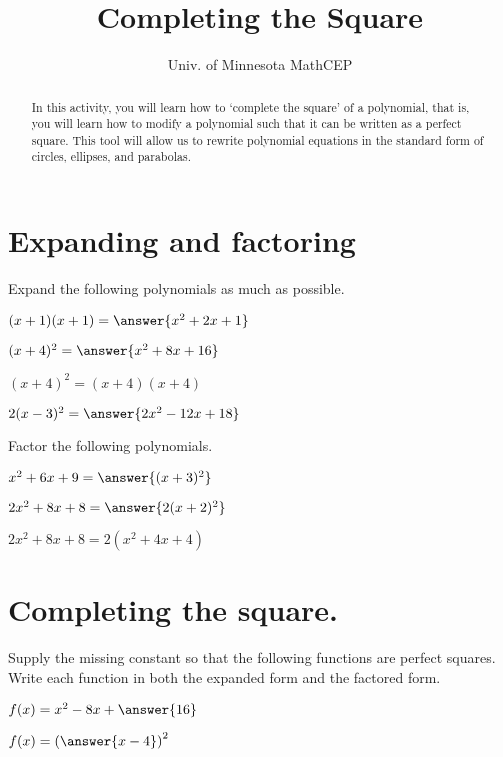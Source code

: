 \documentclass[number]{ximera}
\title{Completing the Square}
\author{Univ. of Minnesota MathCEP}
\begin{document}
\begin{abstract}
  In this activity, you will learn how to `complete the square' of a polynomial, that is, you will learn how to modify a polynomial such that it can be written as a perfect square. This tool will allow us to rewrite polynomial equations in the standard form of circles, ellipses, and parabolas.
\end{abstract}

\maketitle
\section{Expanding and factoring}

Expand the following polynomials as much as possible.

\begin{problem}
$(x+1)(x+1)=\answer{x^2+2x+1}$
\end{problem}

\begin{problem}
$(x+4)^2 = \answer{x^2+8x+16}$
\begin{hint}
$(x+4)^2=(x+4)(x+4)$
\end{hint}
\end{problem}

\begin{problem}
$2(x-3)^2 = \answer{2x^2-12x+18}$
\end{problem}

Factor the following polynomials.

\begin{problem}
$x^2+6x+9 = \answer{(x+3)^2}$
\end{problem}

\begin{problem}
$2x^2+8x+8 = \answer{2(x+2)^2}$
\begin{hint}
$2x^2+8x+8 = 2(x^2+4x+4)$
\end{hint}
\end{problem}

\section{Completing the square.}
Supply the missing constant so that the following functions are perfect squares. Write each function in both the expanded form and the factored form.

\begin{problem}
$f(x) = x^2 - 8x +\answer{16}$

$f(x) = \left(\answer{x-4}\right)^2$
\end{problem}
\end{document}
